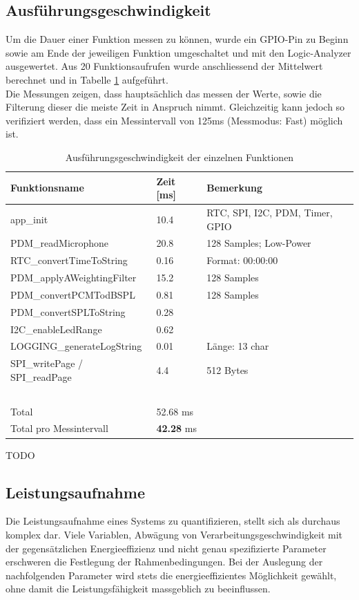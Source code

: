 \documentclass[12pt]{article}
\begin{document}
	\subsection{Ausführungsgeschwindigkeit}
	Um die Dauer einer Funktion messen zu können, wurde ein GPIO-Pin zu Beginn sowie am Ende der jeweiligen Funktion umgeschaltet und mit den Logic-Analyzer ausgewertet. Aus 20 Funktionsaufrufen wurde anschliessend der Mittelwert berechnet und in Tabelle \ref{tab:ausfuehrungsgeschwindigkeit} aufgeführt. \\
	Die Messungen zeigen, dass hauptsächlich das messen der Werte, sowie die Filterung dieser die meiste Zeit in Anspruch nimmt. Gleichzeitig kann jedoch so verifiziert werden, dass ein Messintervall von 125ms (Messmodus: Fast) möglich ist.
	\begin{table}[H]
		\centering
		\begin{tabular}{|l|l|l|}
			\hline
			\textbf{Funktionsname} & \textbf{Zeit [ms]} & \textbf{Bemerkung} \\ \hline
			app\_init & 10.4 & RTC, SPI, I2C, PDM, Timer, GPIO \\ \hline
			PDM\_readMicrophone & 20.8 & 128 Samples; Low-Power \\ \hline
			RTC\_convertTimeToString & 0.16 & Format: 00:00:00 \\ \hline
			PDM\_applyAWeightingFilter & 15.2 & 128 Samples \\ \hline
			PDM\_convertPCMTodBSPL & 0.81 & 128 Samples \\ \hline
			PDM\_convertSPLToString & 0.28 & ~ \\ \hline
			I2C\_enableLedRange & 0.62 & ~ \\ \hline
			LOGGING\_generateLogString & 0.01 & Länge: 13 char \\ \hline
			SPI\_writePage / SPI\_readPage & 4.4 & 512 Bytes \\ \hline
			~ & ~ & ~ \\ \hline
			Total & 52.68 ms & ~ \\ \hline
			Total pro Messintervall & \textbf{42.28} ms & ~ \\ \hline
		\end{tabular}
		\caption{Ausführungsgeschwindigkeit der einzelnen Funktionen}
		\label{tab:ausfuehrungsgeschwindigkeit}
	\end{table}
	\color{red}TODO\color{black}
	\subsection{Leistungsaufnahme}
	Die Leistungsaufnahme eines Systems zu quantifizieren, stellt sich als durchaus komplex dar. Viele Variablen, Abwägung von Verarbeitungsgeschwindigkeit mit der gegensätzlichen Energieeffizienz und nicht genau spezifizierte Parameter erschweren die Festlegung der Rahmenbedingungen. Bei der Auslegung der nachfolgenden Parameter wird stets die energieeffizientes Möglichkeit gewählt, ohne damit die Leistungsfähigkeit massgeblich zu beeinflussen.
\end{document}
